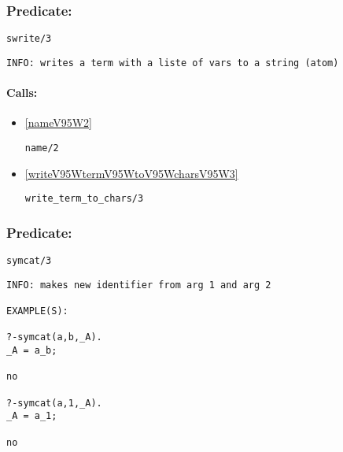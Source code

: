 \subsubsection{Predicate:} \label{swriteV95W3}

\begin{verbatim}
swrite/3
\end{verbatim}

{\small \begin{verbatim}
INFO: writes a term with a liste of vars to a string (atom)

\end{verbatim}}
\paragraph{Calls:} 
\begin{itemize}
\item \ref{nameV95W2} 
\begin{verbatim}
name/2
\end{verbatim}

\item \ref{writeV95WtermV95WtoV95WcharsV95W3} 
\begin{verbatim}
write_term_to_chars/3
\end{verbatim}

\end{itemize}

\subsubsection{Predicate:} \label{symcatV95W3}

\begin{verbatim}
symcat/3
\end{verbatim}

{\small \begin{verbatim}
INFO: makes new identifier from arg 1 and arg 2

EXAMPLE(S):

?-symcat(a,b,_A).
_A = a_b;

no

?-symcat(a,1,_A).
_A = a_1;

no

\end{verbatim}}
